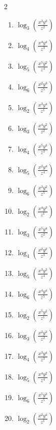 \documentclass[12pt,a4paper]{article}
\begin{document}
\begin{multicols}{2}
\begin{enumerate}[leftmargin=*, itemsep=6pt]

\item \(\log_{3}\left(\frac{x^{3}y^{3}}{z^{2}}\right)\)

\item \(\log_{4}\left(\frac{x^{4}y^{4}}{z^{3}}\right)\)

\item \(\log_{5}\left(\frac{x^{5}y^{2}}{z^{4}}\right)\)

\item \(\log_{6}\left(\frac{x^{2}y^{3}}{z^{5}}\right)\)

\item \(\log_{2}\left(\frac{x^{3}y^{4}}{z^{1}}\right)\)

\item \(\log_{3}\left(\frac{x^{4}y^{2}}{z^{2}}\right)\)

\item \(\log_{4}\left(\frac{x^{5}y^{3}}{z^{3}}\right)\)

\item \(\log_{5}\left(\frac{x^{2}y^{4}}{z^{4}}\right)\)

\item \(\log_{6}\left(\frac{x^{3}y^{2}}{z^{5}}\right)\)

\item \(\log_{2}\left(\frac{x^{4}y^{3}}{z^{1}}\right)\)

\item \(\log_{3}\left(\frac{x^{5}y^{4}}{z^{2}}\right)\)

\item \(\log_{4}\left(\frac{x^{2}y^{2}}{z^{3}}\right)\)

\item \(\log_{5}\left(\frac{x^{3}y^{3}}{z^{4}}\right)\)

\item \(\log_{6}\left(\frac{x^{4}y^{4}}{z^{5}}\right)\)

\item \(\log_{2}\left(\frac{x^{5}y^{2}}{z^{1}}\right)\)

\item \(\log_{3}\left(\frac{x^{2}y^{3}}{z^{2}}\right)\)

\item \(\log_{4}\left(\frac{x^{3}y^{4}}{z^{3}}\right)\)

\item \(\log_{5}\left(\frac{x^{4}y^{2}}{z^{4}}\right)\)

\item \(\log_{6}\left(\frac{x^{5}y^{3}}{z^{5}}\right)\)

\item \(\log_{2}\left(\frac{x^{2}y^{4}}{z^{1}}\right)\)

\end{enumerate}
\end{multicols}
\newpage
\end{document}
